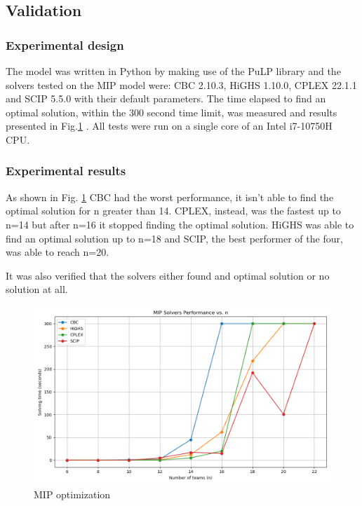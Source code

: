 \documentclass{article}
\begin{document}
\subsection{Validation}
\subsubsection*{Experimental design}
The model was written in Python by making use of the PuLP library and the solvers tested on the MIP model were: CBC 2.10.3, HiGHS 1.10.0, CPLEX 22.1.1 and SCIP 5.5.0 with their default parameters. The time elapsed to find an optimal solution, within the 300 second time limit, was measured and results presented in Fig.\ref{fig:MIP-solution} . All tests were run on a single core of an Intel i7-10750H CPU.

\subsubsection*{Experimental results}
As shown in Fig. \ref{fig:MIP-solution} CBC had the worst performance, it isn't able to find the optimal solution for n greater than 14. CPLEX, instead, was the fastest up to n=14 but after n=16 it stopped finding the optimal solution. HiGHS was able to find an optimal solution up to n=18 and SCIP, the best performer of the four, was able to reach n=20.

It was also verified that the solvers either found and optimal solution or no solution at all.

\begin{figure}
    \centering
    \includegraphics[width=0.8\linewidth]{img/MIP-result.png}
    \caption{MIP optimization}
    \label{fig:MIP-solution}
\end{figure}



\end{document}
